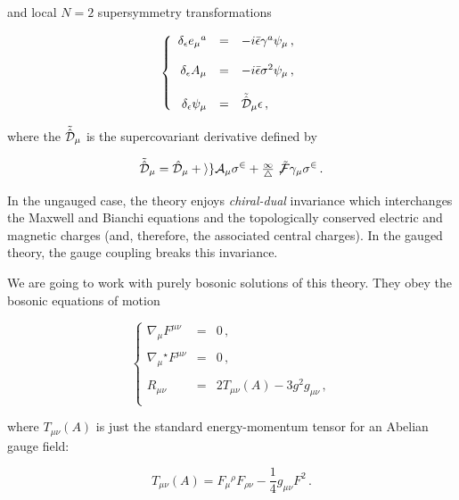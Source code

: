 \documentclass[12pt,a4paper]{article}
\begin{document}
\noindent and local $N=2$ supersymmetry transformations

\begin{equation}
\label{eq:susyt}
\left\{
\begin{array}{rcl}
\delta_{\epsilon} e_{\mu}{}^{a} & = & 
-i\bar{\epsilon}\gamma^{a}\psi_{\mu}\, ,\\
& & \\
\delta_{\epsilon} A_{\mu} & = & 
-i\bar{\epsilon}\sigma^{2}\psi_{\mu}\, ,\\
& & \\
\delta_{\epsilon} \psi_{\mu} & = & 
\tilde{\hat{\cal D}}_{\mu}\epsilon\, ,\\
\end{array}
\right.
\end{equation}

\noindent where the $\tilde{\hat{\cal D}}_{\mu}$ is the
 supercovariant derivative defined by

\begin{equation}
\label{eq:supercovariantderivative}
\tilde{\hat{\cal D}}_{\mu}=
\hat{\cal D}_{\mu} +igA_{\mu}\sigma^{2}
+{\textstyle\frac{1}{4}}\not\!\tilde{F}\gamma_{\mu}\sigma^{2}\, .
\end{equation}

In the ungauged case, the theory enjoys {\it chiral-dual} invariance
which interchanges the Maxwell and Bianchi equations and the
topologically conserved electric and magnetic charges (and, therefore,
the associated central charges). In the gauged theory, the gauge
coupling breaks this invariance.

We are going to work with purely bosonic solutions of this theory.
They obey the bosonic equations of motion

\begin{equation}
\left\{ 
\begin{array}{rcl}
\nabla_{\mu}F^{\mu\nu} & = & 0\, ,\\
& & \\
\nabla_{\mu}{}^{\star}F^{\mu\nu} & = & 0\, ,\\
& & \\
R_{\mu\nu} & = & 2T_{\mu\nu}(A) - 3g^{2} g_{\mu\nu} \, ,\\
\end{array}
\right.
\end{equation}

\noindent where $T_{\mu\nu}(A)$ is just the standard 
energy-momentum tensor for an Abelian gauge field:

\begin{equation}
T_{\mu\nu}(A) = F_{\mu}{}^{\rho}F_{\rho\nu} 
-{\textstyle\frac{1}{4}} g_{\mu\nu}F^{2}\, .  
\end{equation}
\end{document}
